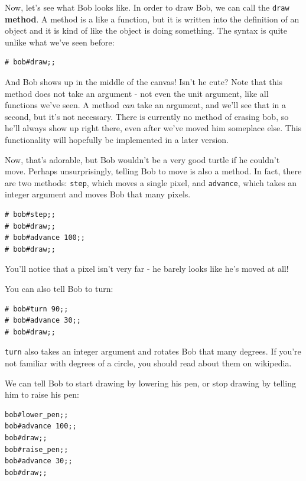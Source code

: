 \documentclass[10pt]{book}
\begin{document}
Now, let's see what Bob looks like. In order to draw Bob, we can call the {\tt draw} {\bf method}. A method is a like a function, but it is written into the definition of an object and it is kind of like the object is doing something. The syntax is quite unlike what we've seen before:

\beforeverb
\begin{verbatim}
# bob#draw;;
\end{verbatim}
\afterverb

And Bob shows up in the middle of the canvas! Isn't he cute? Note that this method does not take an argument - not even the unit argument, like all functions we've seen. A method {\it can} take an argument, and we'll see that in a second, but it's not necessary. There is currently no method of erasing bob, so he'll always show up right there, even after we've moved him someplace else. This functionality will hopefully be implemented in a later version.

Now, that's adorable, but Bob wouldn't be a very good turtle if he couldn't move. Perhaps unsurprisingly, telling Bob to move is also a method. In fact, there are two methods: {\tt step}, which moves a single pixel, and {\tt advance}, which takes an integer argument and moves Bob that many pixels.

\beforeverb
\begin{verbatim}
# bob#step;;
# bob#draw;;
# bob#advance 100;;
# bob#draw;;
\end{verbatim}
\afterverb

You'll notice that a pixel isn't very far - he barely looks like he's moved at all!

You can also tell Bob to turn:

\beforeverb
\begin{verbatim}
# bob#turn 90;;
# bob#advance 30;;
# bob#draw;;
\end{verbatim}
\afterverb

{\tt turn} also takes an integer argument and rotates Bob that many degrees. If you're not familiar with degrees of a circle, you should read about them on wikipedia.

We can tell Bob to start drawing by lowering his pen, or stop drawing by telling him to raise his pen:

\beforeverb
\begin{verbatim}
bob#lower_pen;;
bob#advance 100;;
bob#draw;;
bob#raise_pen;;
bob#advance 30;;
bob#draw;;
\end{verbatim}
\afterverb
\end{document}
